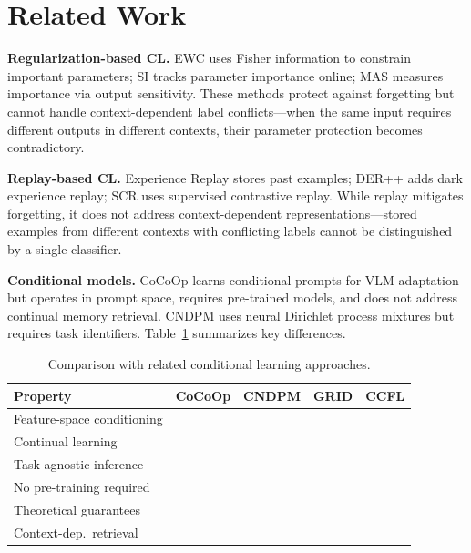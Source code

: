 \documentclass[letterpaper, 10pt, times]{article}
\newcommand{\cmark}{\ding{51}}
\newcommand{\xmark}{\ding{55}}
\begin{document}
\section{Related Work}

\textbf{Regularization-based CL.} EWC \cite{kirkpatrick2017overcoming} uses Fisher information to constrain important parameters; SI \cite{zenke2017continual} tracks parameter importance online; MAS \cite{aljundi2018memory} measures importance via output sensitivity. These methods protect against forgetting but cannot handle context-dependent label conflicts---when the same input requires different outputs in different contexts, their parameter protection becomes contradictory.

\textbf{Replay-based CL.} Experience Replay \cite{chaudhry2019efficient} stores past examples; DER++ \cite{boschini2022class} adds dark experience replay; SCR \cite{buzzega2020rethinking} uses supervised contrastive replay. While replay mitigates forgetting, it does not address context-dependent representations---stored examples from different contexts with conflicting labels cannot be distinguished by a single classifier.

\textbf{Conditional models.} CoCoOp \cite{zhou2022conditional} learns conditional prompts for VLM adaptation but operates in prompt space, requires pre-trained models, and does not address continual memory retrieval. CNDPM \cite{lee2020neural} uses neural Dirichlet process mixtures but requires task identifiers. Table~\ref{tab:related} summarizes key differences.

\begin{table}[t]
\centering
\caption{Comparison with related conditional learning approaches.}
\label{tab:related}
\begin{tabular}{lcccc}
\toprule
Property & CoCoOp & CNDPM & GRID & CCFL \\
\midrule
Feature-space conditioning & \xmark & \xmark & \xmark & \cmark \\
Continual learning & \xmark & \cmark & \cmark & \cmark \\
Task-agnostic inference & \xmark & \xmark & \cmark & \cmark \\
No pre-training required & \xmark & \cmark & \xmark & \cmark \\
Theoretical guarantees & \xmark & \xmark & \xmark & \cmark \\
Context-dep.\ retrieval & \xmark & \xmark & \xmark & \cmark \\
\bottomrule
\end{tabular}
\end{table}
\end{document}
